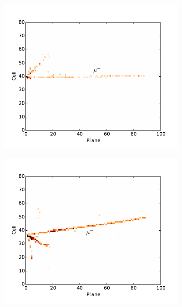\begin{figure}
\begin{center}
\vspace{-40pt}
\begin{subfigure}[c]{0.7\textwidth}
\includegraphics[width=\textwidth]{figures/cnn/view_truetype2_caltype2_event274_x.pdf}
\vspace{-20pt}
\caption*{\xview}
\end{subfigure}
\begin{subfigure}[c]{0.7\textwidth}
\includegraphics[width=\textwidth]{figures/cnn/view_truetype2_caltype2_event274_y.pdf}

\end{subfigure}
\end{center}
\end{figure}

